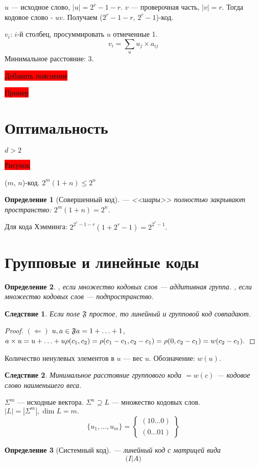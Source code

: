 \documentclass[a4paper,14pt, draft]{report}
\newtheorem{definition}{Определение}
\newtheorem{consequence}{Следствие}
\begin{document}
$u$ --- исходное слово, $|u| = 2^r-1-r$. $v$ --- проверочная часть, $|v| = r$. Тогда кодовое слово - $uv$. Получаем ($2^r-1-r$, $2^r-1$)-код.

$v_i$: $i$-й столбец, просуммировать $u$ отмеченные 1. $$v_i = \sum_u u_j\times a_{ij}$$
Минимальное расстояние: 3.

\colorbox{red}{Добавить пояснение}

\colorbox{red}{Пример}

\section{Оптимальность}

$d > 2$

\colorbox{red}{Рисунок}

($m$, $n$)-код. $2^m (1+n) \le 2^n$
\begin{definition}[Совершенный код]
 --- <<шары>> полностью закрывают пространство: $2^m (1+n) = 2^n$.
\end{definition}

Для кода Хэмминга: $2^{2^r-1-r}(1+2^r-1) = 2^{2^r-1}.$

\section{Групповые и линейные коды}
\begin{definition}
, если множество кодовых слов --- аддитивная группа. , если множество кодовых слов --- подпространство.
\end{definition}
\begin{consequence}Если поле $\mathfrak{F}$ простое, то линейный и групповой код совпадают.
\end{consequence}
\begin{proof}
$(\Leftarrow)$ $u, a \in\mathfrak{F}\\ a = 1+\ldots+1$, $a\times u = u+\ldots+u\\
\rho(c_1, c_2) = \rho(c_1-c_1, c_2-c_1)= \rho(0, c_2-c_1) = w(c_2-c_1).$
\end{proof}
Количество ненулевых элементов в $u$ --- вес $u$. Обозначение: $w(u)$.
\begin{consequence}Минимальное расстояние группового кода $=w(c)$ --- кодовое слово наименьшего веса.
\end{consequence}

$\Sigma^m$ --- исходные вектора. $\Sigma^n\supseteq L$ --- множество кодовых слов.\\$|L| = |\Sigma^m|, \dim L = m.$
\[\{u_1, \ldots, u_m\} = \begin{Bmatrix}(1 0 \ldots 0)\\(0 \ldots 0 1)\end{Bmatrix}\]

\begin{definition}[Системный код]
 --- линейный код с матрицей вида $$\big(I|A\big)$$
\end{definition}
\end{document}
